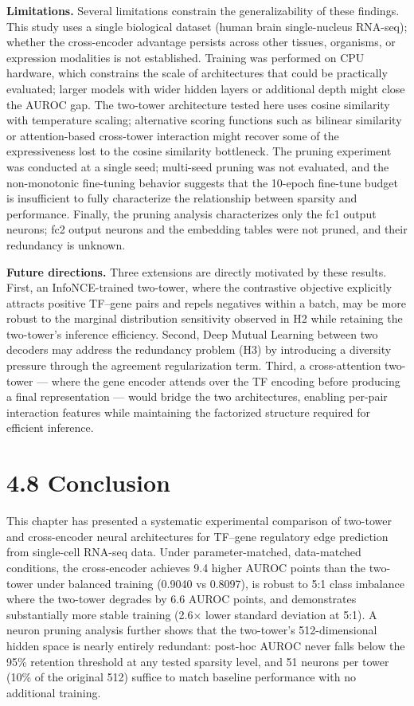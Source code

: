 \documentclass[
  12pt,
]{report}
\begin{document}
\textbf{Limitations.} Several limitations constrain the generalizability
of these findings. This study uses a single biological dataset (human
brain single-nucleus RNA-seq); whether the cross-encoder advantage
persists across other tissues, organisms, or expression modalities is
not established. Training was performed on CPU hardware, which
constrains the scale of architectures that could be practically
evaluated; larger models with wider hidden layers or additional depth
might close the AUROC gap. The two-tower architecture tested here uses
cosine similarity with temperature scaling; alternative scoring
functions such as bilinear similarity or attention-based cross-tower
interaction might recover some of the expressiveness lost to the cosine
similarity bottleneck. The pruning experiment was conducted at a single
seed; multi-seed pruning was not evaluated, and the non-monotonic
fine-tuning behavior suggests that the 10-epoch fine-tune budget is
insufficient to fully characterize the relationship between sparsity and
performance. Finally, the pruning analysis characterizes only the fc1
output neurons; fc2 output neurons and the embedding tables were not
pruned, and their redundancy is unknown.

\textbf{Future directions.} Three extensions are directly motivated by
these results. First, an InfoNCE-trained two-tower, where the
contrastive objective explicitly attracts positive TF--gene pairs and
repels negatives within a batch, may be more robust to the marginal
distribution sensitivity observed in H2 while retaining the two-tower's
inference efficiency. Second, Deep Mutual Learning between two decoders
may address the redundancy problem (H3) by introducing a diversity
pressure through the agreement regularization term. Third, a
cross-attention two-tower --- where the gene encoder attends over the TF
encoding before producing a final representation --- would bridge the
two architectures, enabling per-pair interaction features while
maintaining the factorized structure required for efficient inference.

\section{4.8 Conclusion}\label{conclusion}

This chapter has presented a systematic experimental comparison of
two-tower and cross-encoder neural architectures for TF--gene regulatory
edge prediction from single-cell RNA-seq data. Under parameter-matched,
data-matched conditions, the cross-encoder achieves 9.4 higher AUROC
points than the two-tower under balanced training (0.9040 vs 0.8097), is
robust to 5:1 class imbalance where the two-tower degrades by 6.6 AUROC
points, and demonstrates substantially more stable training (2.6× lower
standard deviation at 5:1). A neuron pruning analysis further shows that
the two-tower's 512-dimensional hidden space is nearly entirely
redundant: post-hoc AUROC never falls below the 95\% retention threshold
at any tested sparsity level, and 51 neurons per tower (10\% of the
original 512) suffice to match baseline performance with no additional
training.
\end{document}
